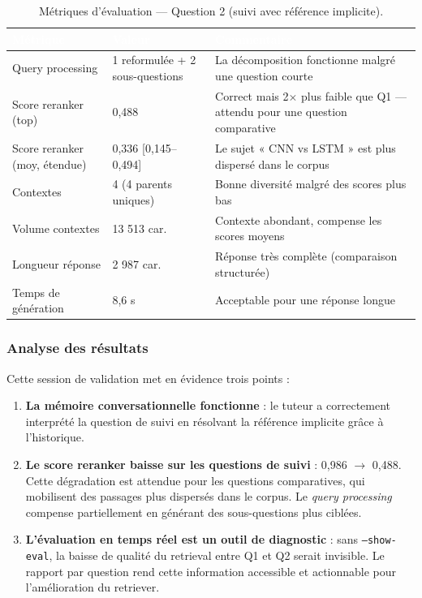 \begin{table}[H]
\centering
\begin{tabularx}{\linewidth}{L{3.5cm} L{2.5cm} L{6cm}}
\toprule
{}
\textcolor{white}{\textbf{Métrique}} & \textcolor{white}{\textbf{Valeur}} & \textcolor{white}{\textbf{Commentaire}} \\
\midrule
Query processing         & 1 reformulée + 2 sous-questions & La décomposition fonctionne malgré une question courte \\
Score reranker (top)     & 0,488  & Correct mais 2$\times$ plus faible que Q1 --- attendu pour une question comparative \\
Score reranker (moy, étendue) & 0,336 [0,145--0,494] & Le sujet « CNN vs LSTM » est plus dispersé dans le corpus \\
Contextes               & 4 (4 parents uniques) & Bonne diversité malgré des scores plus bas \\
Volume contextes        & 13 513 car. & Contexte abondant, compense les scores moyens \\
Longueur réponse        & 2 987 car. & Réponse très complète (comparaison structurée) \\
Temps de génération     & 8,6 s  & Acceptable pour une réponse longue \\
\bottomrule
\end{tabularx}
\caption{Métriques d'évaluation --- Question 2 (suivi avec référence implicite).}
\label{tab:session-q2}
\end{table}

\subsubsection{Analyse des résultats}

Cette session de validation met en évidence trois points :

\begin{enumerate}
  \item \textbf{La mémoire conversationnelle fonctionne} : le tuteur a correctement interprété la question de suivi en résolvant la référence implicite grâce à l'historique.

  \item \textbf{Le score reranker baisse sur les questions de suivi} : 0,986 $\rightarrow$ 0,488. Cette dégradation est attendue pour les questions comparatives, qui mobilisent des passages plus dispersés dans le corpus. Le \textit{query processing} compense partiellement en générant des sous-questions plus ciblées.

  \item \textbf{L'évaluation en temps réel est un outil de diagnostic} : sans \texttt{--show-eval}, la baisse de qualité du retrieval entre Q1 et Q2 serait invisible. Le rapport par question rend cette information accessible et actionnable pour l'amélioration du retriever.
\end{enumerate}

